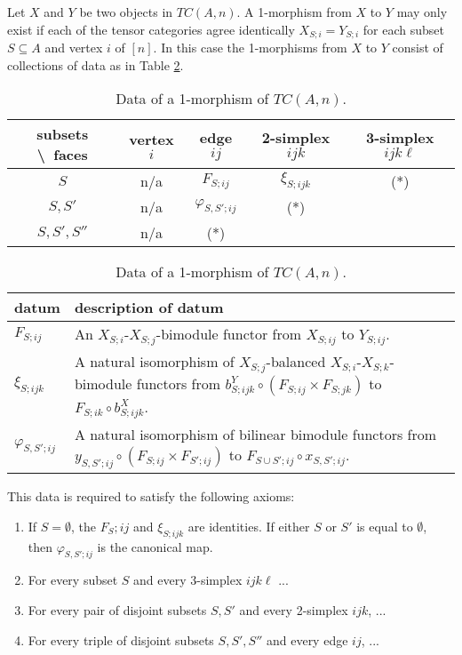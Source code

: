 \documentclass{amsart}
\begin{document}
Let $X$ and $Y$ be two objects in $TC(A,n)$. A 1-morphism from $X$ to $Y$ may only exist if each of the tensor categories agree identically $X_{S;i} = Y_{S;i}$ for each subset $S \subseteq A$ and vertex $i$ of $[n]$. In this case the 1-morphisms from $X$ to $Y$ consist of collections of data as in Table \ref{Table:1MorOfTC}.
\begin{table}[h]
	\caption{Data of a 1-morphism of $TC(A,n)$.}
	\begin{tabular}{c |cccc}
	 subsets \textbackslash\ faces & vertex $i$ & edge $ij$ & 2-simplex $ijk$ & 3-simplex $ijk\ell$  \\
	\hline
	$S$ 				& n/a & $F_{S; ij}$ & $\xi_{S; ijk}$  &  (*) \\
	$S, S'$ 			& n/a & $\varphi_{S, S';ij}$ &  (*) & \\
	$S, S', S''$ 		& n/a  & (*) & & \\
	\end{tabular}
	
	\vspace{1cm}
	
	\begin{tabular}{l p{11cm}}
		datum & description of datum \\ \hline
		$F_{S;ij}$ & An $X_{S;i}$-$X_{S;j}$-bimodule functor from $X_{S;ij}$ to $Y_{S;ij}$. \\
		$\xi_{S;ijk}$ & A natural isomorphism of $X_{S;j}$-balanced $X_{S;i}$-$X_{S;k}$-bimodule functors from $b^Y_{S;ijk} \circ (F_{S;ij} \times F_{S; jk})$ to $F_{S;ik} \circ b^X_{S;ijk}$. \\
		$\varphi_{S,S'; ij}$ & A natural isomorphism of bilinear bimodule functors from $y_{S,S'; ij} \circ (F_{S; ij} \times F_{S';ij})$ to $F_{S \cup S'; ij} \circ x_{S, S'; ij}$. 
	\end{tabular}
	\label{Table:1MorOfTC}
\end{table}
This data is required to satisfy the following axioms:
\begin{enumerate}
	\item If $S = \emptyset$, the $F_S;ij$ and $\xi_{S;ijk}$ are identities. If either $S$ or $S'$ is equal to $\emptyset$, then $\varphi_{S,S';ij}$ is the canonical map.
	\item For every subset $S$ and every 3-simplex $ijk\ell$ ...
	\item For every pair of disjoint subsets $S, S'$ and every 2-simplex $ijk$, ...
	\item For every triple of disjoint subsets $S, S', S''$ and every edge $ij$, ...
\end{enumerate}
\end{document}
